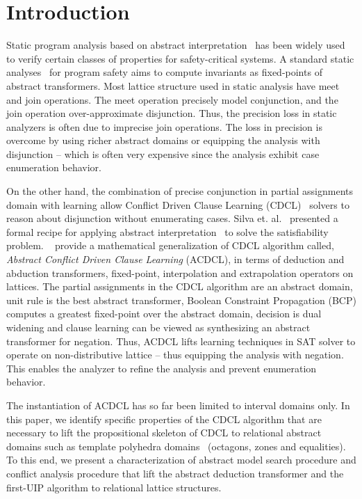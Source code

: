 \section{Introduction}
%
Static program analysis based on abstract 
interpretation~\cite{DBLP:conf/emsoft/Cousot07} has been widely used to
verify certain classes of properties for safety-critical systems.  A 
standard static analyses~\cite{se2011} for program safety aims to compute 
invariants as fixed-points of abstract transformers.  Most lattice structure 
used in static analysis have meet and join operations.  The meet operation 
precisely model conjunction, and the join operation over-approximate 
disjunction. Thus, the precision loss in static analyzers is often 
due to imprecise join operations. The loss in precision is overcome 
by using richer abstract domains or equipping the analysis with disjunction --
which is often very expensive since the analysis exhibit case enumeration 
behavior. 

On the other hand, the combination of precise conjunction in partial assignments 
domain with learning allow Conflict Driven Clause Learning (CDCL)~\cite{cdcl} 
solvers to reason about disjunction without enumerating cases.  
Silva et. al.~\cite{tacas12, sas12, dhk2013-popl} presented 
a formal recipe for applying abstract interpretation~\cite{se2011} to solve the 
satisfiability problem.  ~\cite{sas12} provide a mathematical generalization 
of CDCL algorithm called, {\em Abstract Conflict Driven Clause Learning} (ACDCL), 
in terms of deduction and abduction transformers, fixed-point, interpolation 
and extrapolation operators on lattices.  The partial assignments in the 
CDCL algorithm are an abstract domain, unit rule is the best abstract 
transformer,  Boolean Constraint Propagation (BCP) computes a greatest fixed-point 
over the abstract domain, decision is dual widening and clause learning can be 
viewed as synthesizing an abstract transformer for negation.  Thus, ACDCL 
lifts learning techniques in SAT solver to operate on non-distributive 
lattice -- thus equipping the analysis with negation. This enables the 
analyzer to refine the analysis and prevent enumeration behavior.

The instantiation of ACDCL has so far been limited to interval domains only.  
In this paper, we identify specific properties of the CDCL algorithm that 
are necessary to lift the propositional skeleton of CDCL to relational 
abstract domains such as template polyhedra domains~\cite{sriram} 
(octagons, zones and equalities).  To this end, we present a characterization 
of abstract model search procedure and conflict analysis procedure that lift 
the abstract deduction transformer and the first-UIP algorithm to 
relational lattice structures. 
